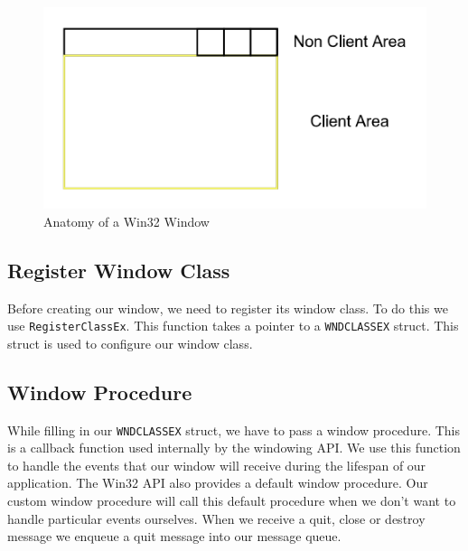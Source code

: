 \begin{figure}[ht]
    \centering
    \includegraphics[scale=0.50]{images/ChInitializingVulkan/Win32Window.png}
    \caption{Anatomy of a Win32 Window}
    \label{fig::Win32Window}
\end{figure}

\begin{minipage}{\linewidth}{\noindent}
    
\end{minipage}

\subsection{Register Window Class}

Before creating our window, we need to register its window class.
To do this we use \texttt{RegisterClassEx}.
This function takes a pointer to a \texttt{WNDCLASSEX} struct.
This struct is used to configure our window class.

\begin{minipage}{\linewidth}{\noindent}
    
\end{minipage}

\subsection{Window Procedure}

While filling in our \texttt{WNDCLASSEX} struct, we have to pass a window procedure.
This is a callback function used internally by the windowing API.
We use this function to handle the events that our window will receive during
the lifespan of our application.
The Win32 API also provides a default window procedure.
Our custom window procedure will call this default procedure when we don't want
to handle particular events ourselves.
When we receive a quit, close or destroy message we enqueue a quit message
into our message queue.

